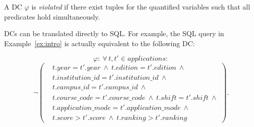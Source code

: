 A DC $\varphi$ is \emph{violated} if there exist tuples for the quantified variables such that all predicates hold simultaneously.

DCs can be translated directly to SQL.
For example, the SQL query in Example~\ref{ex:intro} is actually equivalent to the following DC:

\begingroup\small
\[
\varphi:\ \forall\, t, t' \in \mathit{applications}:
\]
\[ 
\neg\!\left(
\begin{aligned}
& t.\mathit{year}=t'.\mathit{year}\ \land\ t.\mathit{edition}=t'.\mathit{edition}\ \land \\
& t.\mathit{institution\_id}=t'.\mathit{institution\_id}\ \land \\
& t.\mathit{campus\_id}=t'.\mathit{campus\_id}\ \land \\
& t.\mathit{course\_code}=t'.\mathit{course\_code}\ \land\ t.\mathit{shift}=t'.\mathit{shift}\ \land \\
& t.\mathit{application\_mode}=t'.\mathit{application\_mode}\ \land \\
& t.\mathit{score}>t'.\mathit{score}\ \land\ t.\mathit{ranking}>t'.\mathit{ranking}
\end{aligned}
\right).
\]
\endgroup

